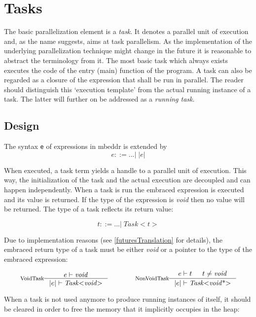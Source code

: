 \section{Tasks}
The basic parallelization element is a \textit{task}. It denotes a parallel unit of execution and, as the name suggests, aims at task parallelism. As the implementation of the underlying parallelization technique might change in the future it is reasonable to abstract the terminology from it. The most basic task which always exists executes the code of the entry (main) function of the program. A task can also be regarded as a closure of the expression that shall be run in parallel. The reader should distinguish this `execution template' from the actual running instance of a task. The latter will further on be addressed as a \textit{running task}.
\subsection{Design}
\label{tasksDesign}
The syntax \texttt{e} of expressions in mbeddr is extended by
\begin{equation}
e ::= ...|\;\mathit{|e|}
\end{equation}

When executed, a task term yields a handle to a parallel unit of execution. This way, the initialization of the task and the actual execution are decoupled and can happen independently. When a task is run the embraced expression is executed and its value is returned. If the type of the expression is \textit{void} then no value will be returned. The type of a task reflects its return value:

\begin{equation}
t ::= ... |\;\mathit{Task{<}t{>}}
\end{equation}

Due to implementation reasons (see \ref{futuresTranslation} for details), the embraced return type of a task must be either \textit{void} or a pointer to the type of the embraced expression:

\begin{equation}
\inference*[VoidTask]{e |- \mathit{void}}{|e| |- \mathit{Task{<}void{>}}} 
\qquad\qquad
\inference*[NonVoidTask]{e |- t & t \neq \mathit{void}}{|e| |- \mathit{Task{<}void{\text{*}}{>}}}
\end{equation}

When a task is not used anymore to produce running instances of itself, it should be cleared in order to free the memory that it implicitly occupies in the heap:


